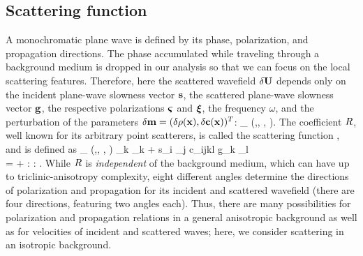 \subsection{Scattering function}
A monochromatic plane wave is defined by its phase, polarization, and 
propagation directions. The phase accumulated while traveling through 
a background medium is dropped in our analysis so that we can focus on the local scattering 
features. Therefore, here the scattered wavefield $\delta 
\mathbf{U}$ depends only on the incident plane-wave slowness vector $\mathbf{s}$, the scattered plane-wave slowness vector $\mathbf{g}$, the respective 
polarizations $\bm{\varsigma}$ and $\bm{\xi}$, the frequency $\omega$, and the 
perturbation of the parameters 
$\delta \mathbf{m}  = (\delta \rho(\mathbf{x}), \delta \mathbf{c}(\mathbf{x}))^T$:
\beq
\delta \Uv \cdot \gpv  \propto \SF_{\delta \mv} (\sv,\gv, \spv, \gpv).
\eeq
%
The coefficient $R$, well known for its arbitrary point scatterers, is called the scattering function \citep{eaton1994, shaw2004, 
calvet2006, kazei2018}, and is defined as 
%
\beq \label{eq:sfun}
\SF_{\delta \mv} (\sv,\gv, \spv, \gpv) \equiv \sp_k \gp_k \delta \rho  + 
s_i \sp_j \delta c_{ijkl} g_k \gp_l 
\\
= \spv \cdot \gpv \delta \rho + \sv \tmul \spv : \delta \cv : \gv \tmul \gpv.
\eeq
While $R$ is \emph{independent} of the background medium, which can have up to triclinic-anisotropy complexity, eight 
different angles determine the directions of polarization and propagation for its incident and scattered wavefield (there are four directions, featuring two angles each). 
Thus, there are many possibilities for polarization and propagation relations in a general anisotropic background as well as for velocities of incident and scattered waves; here, we consider scattering in an isotropic background.
 

